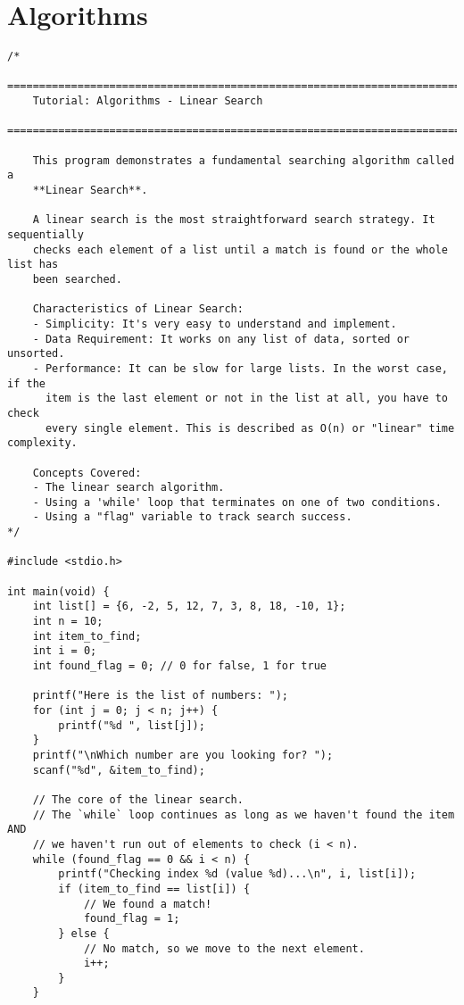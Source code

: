 \documentclass[11pt]{book}
\begin{document}
\chapter{Algorithms}
\clearpage
\begin{verbatim}
/*
    ================================================================================
    Tutorial: Algorithms - Linear Search
    ================================================================================

    This program demonstrates a fundamental searching algorithm called a
    **Linear Search**.

    A linear search is the most straightforward search strategy. It sequentially
    checks each element of a list until a match is found or the whole list has
    been searched.

    Characteristics of Linear Search:
    - Simplicity: It's very easy to understand and implement.
    - Data Requirement: It works on any list of data, sorted or unsorted.
    - Performance: It can be slow for large lists. In the worst case, if the
      item is the last element or not in the list at all, you have to check
      every single element. This is described as O(n) or "linear" time complexity.

    Concepts Covered:
    - The linear search algorithm.
    - Using a 'while' loop that terminates on one of two conditions.
    - Using a "flag" variable to track search success.
*/

#include <stdio.h>

int main(void) {
    int list[] = {6, -2, 5, 12, 7, 3, 8, 18, -10, 1};
    int n = 10;
    int item_to_find;
    int i = 0;
    int found_flag = 0; // 0 for false, 1 for true

    printf("Here is the list of numbers: ");
    for (int j = 0; j < n; j++) {
        printf("%d ", list[j]);
    }
    printf("\nWhich number are you looking for? ");
    scanf("%d", &item_to_find);

    // The core of the linear search.
    // The `while` loop continues as long as we haven't found the item AND
    // we haven't run out of elements to check (i < n).
    while (found_flag == 0 && i < n) {
        printf("Checking index %d (value %d)...\n", i, list[i]);
        if (item_to_find == list[i]) {
            // We found a match!
            found_flag = 1;
        } else {
            // No match, so we move to the next element.
            i++;
        }
    }


\end{verbatim}
\end{document}
